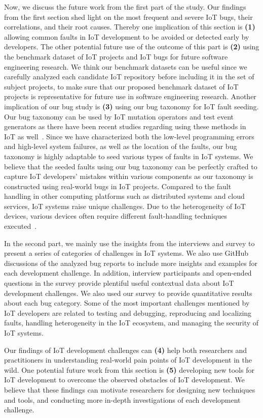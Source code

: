 Now, we discuss the future work from the first part of the study. Our findings from the first section shed light on the most frequent and severe IoT bugs, their correlations, and their root causes. Thereby one implication of this section is \textbf{(1)} allowing common faults in IoT development to be avoided or detected early by developers. The other potential future use of the outcome of this part is \textbf{(2)} using the benchmark dataset of IoT projects and IoT bugs for future software engineering research. We think our benchmark datasets can be useful since we carefully analyzed each candidate IoT repository before including it in the set of subject projects, to make sure that our proposed benchmark dataset of IoT projects is representative for future use in software engineering research. Another implication of our bug study is \textbf{(3)} using our bug taxonomy for IoT fault seeding. Our bug taxonomy can be used by IoT mutation operators and test event generators as there have been recent studies regarding using these methods in IoT as well~\cite{gutierrez2019evolutionary,gutierrez2018iot}. Since we have characterized both the low-level programming errors and high-level system failures, as well as the location of the faults, our bug taxonomy is highly adaptable to seed various types of faults in IoT systems. We believe that the seeded faults using our bug taxonomy can be perfectly crafted to capture IoT developers' mistakes within various components as our taxonomy is constructed using real-world bugs in IoT projects. Compared to the fault handling in other computing platforms such as distributed systems and cloud services, IoT systems raise unique challenges. Due to the heterogeneity of IoT devices, various devices often require different fault-handling techniques executed~\cite{norris2020iotrepair}.

In the second part, we mainly use the insights from the interviews and survey to present a series of categories of challenges in IoT systems. We also use GitHub discussions of the analyzed bug reports to include more insights and examples for each development challenge. In addition, interview participants and open-ended questions in the survey provide plentiful useful contextual data about IoT development challenges. We also used our survey to provide quantitative results about each bug category. Some of the most important challenges mentioned by IoT developers are related to testing and debugging, reproducing and localizing faults, handling heterogeneity in the IoT ecosystem, and managing the security of IoT systems. 

Our findings of IoT development challenges can \textbf{(4)} help both researchers and practitioners in understanding real-world pain points of IoT development in the wild. One potential future work from this section is \textbf{(5)} developing new tools for IoT development to overcome the observed obstacles of IoT development. We believe that these findings can motivate researchers for designing new techniques and tools, and conducting more in-depth investigations of each development challenge.

\endinput


